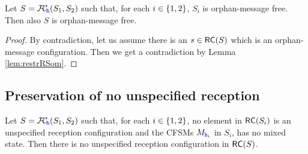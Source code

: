 \begin{corollary}%
\label{prop:nomPreservation}
Let $S = {\mathcal{F}\!\mathcal{C}}_{\!{\mathtt{\color{blue}{ {h}}}}}(S_1,S_2)$ such that, for each $i\in \{1,2\}$, 
$S_i$ is orphan-message free.
Then also $S$ is orphan-message free.
\end{corollary}
\begin{proof}
By contradiction, let us assume there is an $s\in \mathsf{RC}(S)$ which is an orphan-message configuration. Then we get
a contradiction by Lemma \ref{lem:restrRSom}.
\end{proof}



\subsection{Preservation of no unspecified reception}


\begin{proposition}%
\label{prop:nurPreservation}
Let $S = {\mathcal{F}\!\mathcal{C}}_{\!{\mathtt{\color{blue}{ {h}}}}}(S_1,S_2)$ such that, for each $i\in \{1,2\}$, 
no element in $\mathsf{RC}(S_{i})$ is an unspecified reception configuration 
and the CFSMs $M_{{\mathtt{\color{blue}{ {h}}}}_i}$ in $S_i$, has no mixed state.
Then there is no unspecified reception configuration in $\mathsf{RC}(S)$.
\end{proposition}



